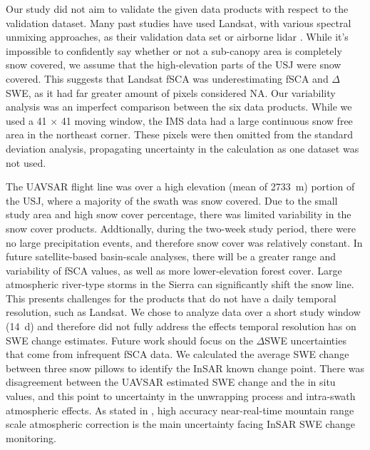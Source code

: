 Our study did not aim to validate the given data products with respect to the validation dataset. Many past studies have used Landsat, with various spectral unmixing approaches, as their validation data set \citep{painterRetrievalSubpixelSnow2009,rittgerAssessmentMethodsMapping2013} or airborne lidar \citep{stillingerLandsatMODISVIIRS2023}. While it's impossible to confidently say whether or not a sub-canopy area is completely snow covered, we assume that the high-elevation parts of the USJ were snow covered. This suggests that Landsat fSCA was underestimating fSCA and $\Delta$SWE, as it had far greater amount of pixels considered NA. Our variability analysis was an imperfect comparison between the six data products. While we used a 41 $\times$ 41 moving window, the IMS data had a large continuous snow free area in the northeast corner. These pixels were then omitted from the standard deviation analysis, propagating uncertainty in the calculation as one dataset was not used.

The UAVSAR flight line was over a high elevation (mean of 2733~m) portion of the USJ, where a majority of the swath was snow covered. Due to the small study area and high snow cover percentage, there was limited variability in the snow cover products. Addtionally, during the two-week study period, there were no large precipitation events, and therefore snow cover was relatively constant. In future satellite-based basin-scale analyses, there will be a greater range and variability of fSCA values, as well as more lower-elevation forest cover. Large atmospheric river-type storms in the Sierra can significantly shift the snow line. This presents challenges for the products that do not have a daily temporal resolution, such as Landsat. We chose to analyze data over a short study window (14~d) and therefore did not fully address the effects temporal resolution has on SWE change estimates. Future work should focus on the $\Delta$SWE uncertainties that come from infrequent fSCA data. We calculated the average SWE change between three snow pillows to identify the InSAR known change point. There was disagreement between the UAVSAR estimated SWE change and the in situ values, and this point to uncertainty in the unwrapping process and intra-swath atmospheric effects. As stated in \cite{tarriconeEstimatingSnowAccumulation2023a}, high accuracy near-real-time mountain range scale atmospheric correction is the main uncertainty facing InSAR SWE change monitoring. 

